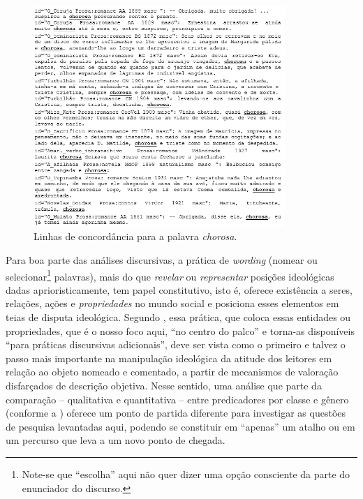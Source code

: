 \documentclass[portuguese]{textolivre}
\begin{document}
\begin{figure}[htbp]
 \centering
 \includegraphics[width=0.85\textwidth]{Fig4.png}
 \caption{Linhas de concordância para a palavra \textit{chorosa}.}
 \label{fig4}
\end{figure}

Para boa parte das análises discursivas, a prática de \textit{wording} (nomear ou selecionar\footnote{Note-se que “escolha” aqui não quer dizer uma opção consciente da parte do enunciador do discurso.} palavras), mais do que \textit{revelar} ou \textit{representar} posições ideológicas dadas aprioristicamente, tem papel constitutivo, isto é, oferece existência a seres, relações, ações e \textit{propriedades} no mundo social e posiciona esses elementos em teias de disputa ideológica. Segundo \textcite{rajagopalan2010}, essa prática, que coloca essas entidades ou propriedades, que é o nosso foco aqui, “no centro do palco” e torna-as disponíveis “para práticas discursivas adicionais”, deve ser vista como o primeiro e talvez o passo mais importante na manipulação ideológica da atitude dos leitores em relação ao objeto nomeado e comentado, a partir de mecanismos de valoração disfarçados de descrição objetiva. Nesse sentido, uma análise que parte da comparação – qualitativa e quantitativa – entre predicadores por classe e gênero (conforme a ) oferece um ponto de partida diferente para investigar as questões de pesquisa levantadas aqui, podendo se constituir em “apenas” um atalho ou em um percurso que leva a um novo ponto de chegada.
\end{document}
